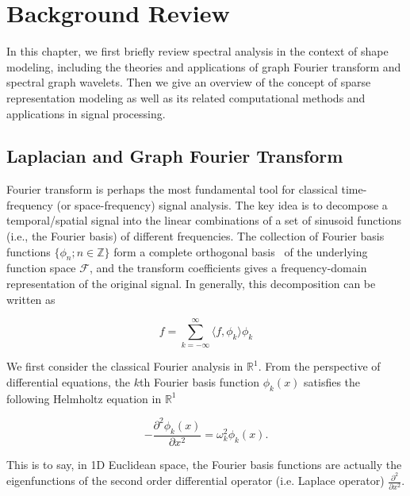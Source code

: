 \chapter{Background Review}
In this chapter, we first briefly review spectral analysis in the context
of shape modeling, including the theories and applications of graph Fourier
transform and spectral graph wavelets. Then we give an overview of the
concept of sparse representation modeling as well as its related computational
methods and applications in signal processing.

\section{Laplacian and Graph Fourier Transform}

Fourier transform is perhaps the most fundamental tool for classical
time-frequency (or space-frequency) signal analysis. The key idea is to decompose
a temporal/spatial signal into the linear combinations of a set of sinusoid
functions (i.e., the Fourier basis) of different frequencies. The collection of
Fourier basis functions $\{\phi_n;n\in \mathbb{Z}\}$ form a complete orthogonal
basis~\cite{Gomes:1999} of the underlying function space $\mathcal{F}$, and the
transform coefficients gives a frequency-domain representation of the original
signal. In generally, this decomposition can be written as

\begin{equation}
f=\sum_{k=-\infty}^\infty \langle f,\phi_k\rangle\phi_k
\end{equation}

We first consider the classical Fourier analysis in $\mathbb{R}^1$. From the
perspective of differential equations, the $k$th Fourier basis function
$\phi_k(x)$ satisfies the following Helmholtz equation in $\mathbb{R}^1$

\begin{equation}\label{eq:Helmholtz1D}
-\frac{\partial^2 \phi_k(x)}{\partial x^2}=\omega_k^2 \phi_k(x).
\end{equation}

This is to say, in 1D Euclidean space, the Fourier basis functions are actually
the eigenfunctions of the second order differential operator (i.e. Laplace operator)
$\frac{\partial^2}{\partial x^2}$.

